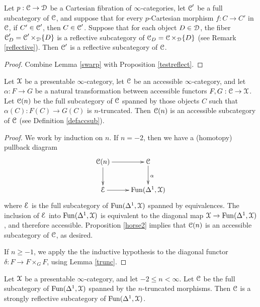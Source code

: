\begin{lemma}\label{swarp2}
Let $p: \operatorname{\mathcal{C}} \rightarrow \operatorname{\mathcal{D}}$ be a Cartesian fibration of $\infty$-categories, let
$\operatorname{\mathcal{C}}'$ be a full subcategory of $\operatorname{\mathcal{C}}$, and suppose that for every $p$-Cartesian morphism
$f: C \rightarrow C'$ in $\operatorname{\mathcal{C}}$, if $C' \in \operatorname{\mathcal{C}}'$, then $C \in \operatorname{\mathcal{C}}'$. Suppose that for each
object $D \in \operatorname{\mathcal{D}}$, the fiber $\operatorname{\mathcal{C}}'_{D} = \operatorname{\mathcal{C}}' \times_{\operatorname{\mathcal{D}}} \{D\}$ is a reflective subcategory
of $\operatorname{\mathcal{C}}_{D} = \operatorname{\mathcal{C}} \times_{\operatorname{\mathcal{D}}} \{D\}$ (see Remark \ref{reflective}). Then $\operatorname{\mathcal{C}}'$ is a reflective subcategory of $\operatorname{\mathcal{C}}$.
\end{lemma}

\begin{proof}
Combine Lemma \ref{swarp} with Proposition \ref{testreflect}.
\end{proof}

\begin{lemma}\label{swarp3}
Let $\operatorname{\mathcal{X}}$ be a presentable $\infty$-category, let $\operatorname{\mathcal{C}}$ be an accessible $\infty$-category,
and let $\alpha: F \rightarrow G$ be a natural transformation between accessible functors
$F,G: \operatorname{\mathcal{C}} \rightarrow \operatorname{\mathcal{X}}$. Let $\operatorname{\mathcal{C}}(n)$ be the full subcategory of $\operatorname{\mathcal{C}}$ spanned by those objects $C$ such that $\alpha(C): F(C) \rightarrow G(C)$ is $n$-truncated. Then $\operatorname{\mathcal{C}}(n)$ is an accessible subcategory of $\operatorname{\mathcal{C}}$ (see Definition \ref{defaccsub}).
\end{lemma}

\begin{proof}
We work by induction on $n$. If $n=-2$, then we have a (homotopy) pullback diagram
$$ \xymatrix{ \calC(n) \ar[r] \ar[d] & \calC \ar[d]^{\alpha} \\
\calE \ar[r] & \Fun(\Delta^1,\calX) }$$
where $\operatorname{\mathcal{E}}$ is the full subcategory of $\operatorname{Fun}(\Delta^1,\operatorname{\mathcal{X}})$ spanned by
equivalences. The inclusion of $\operatorname{\mathcal{E}}$ into $\operatorname{Fun}(\Delta^1,\operatorname{\mathcal{X}})$ is equivalent
to the diagonal map $\operatorname{\mathcal{X}} \rightarrow \operatorname{Fun}(\Delta^1, \operatorname{\mathcal{X}})$, and therefore accessible.
Proposition \ref{horse2} implies that $\operatorname{\mathcal{C}}(n)$ is an accessible subcategory of $\operatorname{\mathcal{C}}$, as desired.

If $n \geq -1$, we apply the the inductive hypothesis to the diagonal functor
$\delta: F \rightarrow F \times_{G} F$, using Lemma \ref{trunc}.
\end{proof}

\begin{lemma}\label{tur}
Let $\operatorname{\mathcal{X}}$ be a presentable $\infty$-category, and let $-2 \leq n < \infty$. Let
$\operatorname{\mathcal{C}}$ be the full subcategory of $\operatorname{Fun}(\Delta^1,\operatorname{\mathcal{X}})$ spanned by the $n$-truncated
morphisms. Then $\operatorname{\mathcal{C}}$ is a strongly reflective subcategory of $\operatorname{Fun}(\Delta^1,\operatorname{\mathcal{X}})$.
\end{lemma}


